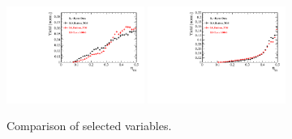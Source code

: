 \begin{figure}[h]
\includegraphics[height=!,width=0.4\textwidth]{figs/dataVsMC/trigger_norm/Ds2all_Bs_TAGOMEGA_OS.pdf}
\includegraphics[height=!,width=0.4\textwidth]{figs/dataVsMC/trigger_norm/Ds2all_Bs_SS_nnetKaon_PROB.pdf}


\caption{Comparison of selected variables.}
\label{fig:}
\end{figure}

